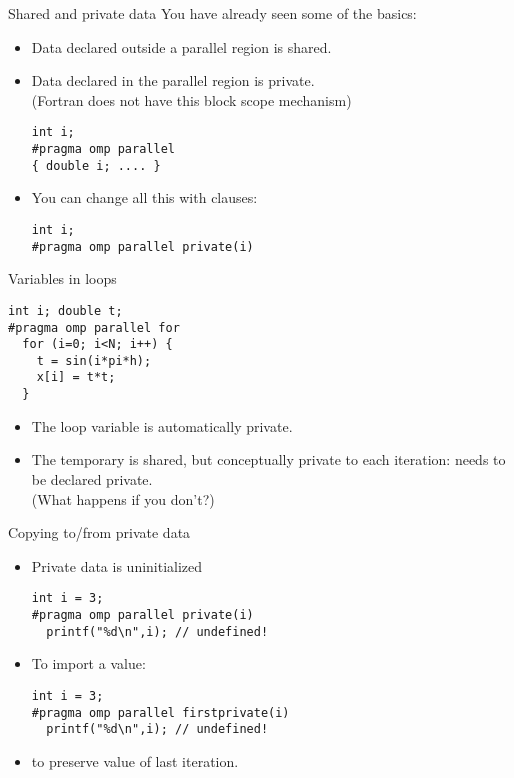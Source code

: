 
\begin{numberedframe}{Shared and private data}
  You have already seen some of the basics:
  \begin{itemize}
  \item Data declared outside a parallel region is shared.
  \item Data declared in the parallel region is private.\\
    (Fortran does not have this block scope mechanism)
\begin{lstlisting}
int i;
#pragma omp parallel 
{ double i; .... }
\end{lstlisting}
  \item You can change all this with clauses:
\begin{lstlisting}
int i;
#pragma omp parallel private(i)
\end{lstlisting}
  \end{itemize}
\end{numberedframe}

\begin{numberedframe}{Variables in loops}
\begin{lstlisting}
int i; double t;
#pragma omp parallel for 
  for (i=0; i<N; i++) {
    t = sin(i*pi*h);
    x[i] = t*t;
  }
\end{lstlisting}
  \begin{itemize}
  \item The loop variable is automatically private.
  \item The temporary  is shared, but conceptually private to
    each iteration: needs to be declared private.\\
    (What happens if you don't?)
  \end{itemize}
\end{numberedframe}

\begin{numberedframe}{Copying to/from private data}
  \begin{itemize}
  \item Private data is uninitialized
\begin{lstlisting}
int i = 3;
#pragma omp parallel private(i)
  printf("%d\n",i); // undefined!
\end{lstlisting}
  \item To import a value:
\begin{lstlisting}
int i = 3;
#pragma omp parallel firstprivate(i)
  printf("%d\n",i); // undefined!
\end{lstlisting}
  \item {} to preserve value of last iteration.
  \end{itemize}
\end{numberedframe}

